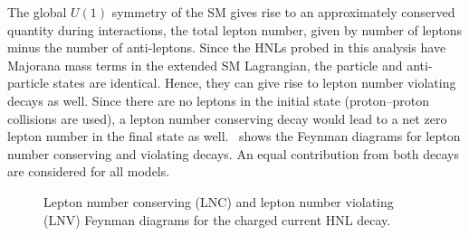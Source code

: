 The global $U(1)$ symmetry of the SM gives rise to an approximately conserved quantity during interactions, the total lepton number, given by number of leptons minus the number of anti-leptons. Since the HNLs probed in this analysis have Majorana mass terms in the extended SM Lagrangian, the particle and anti-particle states are identical. Hence, they can give rise to lepton number violating decays as well. Since there are no leptons in the initial state (proton--proton collisions are used), a lepton number conserving decay would lead to a net zero lepton number in the final state as well.~ shows the Feynman diagrams for lepton number conserving and violating decays. An equal contribution from both decays are considered for all models.

\begin{figure}[ht!]
\centering
{}
\caption{Lepton number conserving (LNC) and lepton number violating (LNV) Feynman diagrams for the charged current HNL decay.}
\label{fig:feynman_lnc_lnv}
\end{figure}

